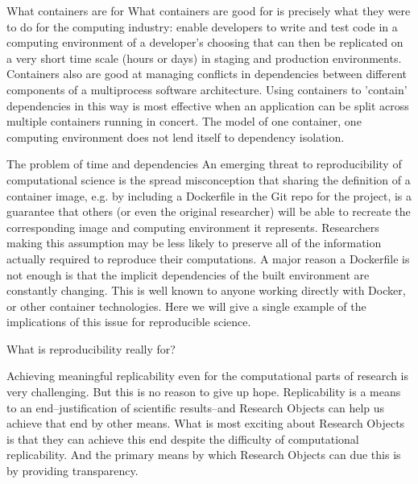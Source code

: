 			What containers are for
				What containers are good for is precisely what they were to do for the computing industry:  enable developers to write and test code in a
					computing environment of a developer's choosing that can then be replicated on a very short time scale (hours or days) in staging
					and production environments.
				Containers also are good at managing conflicts in dependencies between different components of a multiprocess software architecture.
				Using containers to 'contain' dependencies in this way is most effective when an application can be split across multiple containers running in concert.
				The model of one container, one computing environment does not lend itself to dependency isolation.

			The problem of time and dependencies
				An emerging threat to reproducibility of computational science is the spread misconception that sharing the definition of a container image,
					e.g. by including a Dockerfile in the Git repo for the project, is a guarantee that others (or even the original researcher) will be able to
					recreate the corresponding image and computing environment it represents.
				Researchers making this assumption may be less likely to preserve all of the information actually required to reproduce their computations.
				A major reason a Dockerfile is not enough is that the implicit dependencies of the built environment are constantly changing.
				This is well known to anyone working directly with Docker, or other container technologies.
				Here we will give a single example of the implications of this issue for reproducible science.

	What is reproducibility really for?

		Achieving meaningful replicability even for the computational parts of research is very challenging.
		But this is no reason to give up hope.
		Replicability is a means to an end--justification of scientific results--and Research Objects can help us achieve that end by other means.
		What is most exciting about Research Objects is that they can achieve this end despite the difficulty of computational replicability.
		And the primary means by which Research Objects can due this is by providing transparency.
